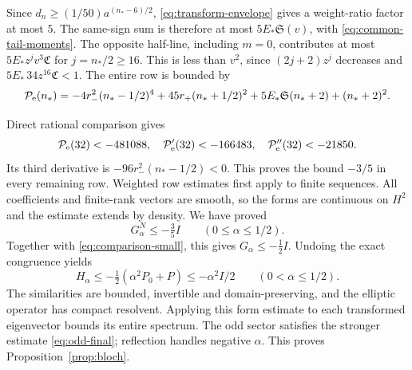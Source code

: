 \documentclass[a4paper,11pt]{article}
\numberwithin{equation}{section}
\theoremstyle{definition}
\theoremstyle{remark}
\begin{document}
Since $d_n\ge(1/50)a^{(n_*-6)/2}$, \eqref{eq:transform-envelope} gives a weight-ratio factor at most $5$. The same-sign sum is therefore at most $5E_*\mathfrak S(v)$, with \eqref{eq:common-tail-moments}. The opposite half-line, including $m=0$, contributes at most $5E_*z^jv^3\mathfrak C$ for $j=n_*/2\ge16$. This is less than $v^2$, since $(2j+2)z^j$ decreases and $5E_*\,34z^{16}\mathfrak C<1$. The entire row is bounded by
\begin{equation}\label{eq:even-high}
 \mathcal P_{\rm e}(n_*)=-4r_-^2(n_*-1/2)^4+45r_+(n_*+1/2)^2
 +5E_*\mathfrak S(n_*+2)+(n_*+2)^2.
\end{equation}

Direct rational comparison gives
\[
 \mathcal P_{\rm e}(32)<-481088,\quad
 \mathcal P_{\rm e}'(32)<-166483,\quad
 \mathcal P_{\rm e}''(32)<-21850.
\]
Its third derivative is $-96r_-^2(n_*-1/2)<0$. This proves the bound $-3/5$ in every remaining row. Weighted row estimates first apply to finite sequences. All coefficients and finite-rank vectors are smooth, so the forms are continuous on $H^2$ and the estimate extends by density. We have proved
\[
 G_\alpha^N\le-\tfrac35I\qquad(0\le\alpha\le1/2).
\]
Together with \eqref{eq:comparison-small}, this gives $G_\alpha\le-\tfrac12I$. Undoing the exact congruence yields
\[
 H_\alpha\le-\tfrac12(\alpha^2P_0+P)\le-\alpha^2I/2\qquad(0<\alpha\le1/2).
\]
The similarities are bounded, invertible and domain-preserving, and the elliptic operator has compact resolvent. Applying this form estimate to each transformed eigenvector bounds its entire spectrum. The odd sector satisfies the stronger estimate \eqref{eq:odd-final}; reflection handles negative $\alpha$. This proves Proposition~\ref{prop:bloch}.
\end{document}
